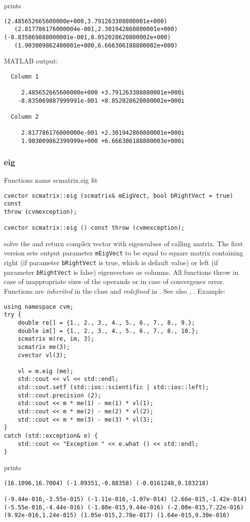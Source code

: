 prints
\begin{Verbatim}
(2.485652665600000e+000,3.791263308800001e+000)
   (2.817786176000004e-001,2.301942860800001e+000)
(-8.835069888000001e-001,8.052028620800002e+000)
   (1.903009862400001e+000,6.666306188800002e+000)
\end{Verbatim}
MATLAB output:
\begin{Verbatim}
  Column 1

     2.485652665600000e+000 +3.791263308800001e+000i
    -8.835069887999991e-001 +8.052028620800002e+000i

  Column 2

     2.817786176000000e-001 +2.301942860800001e+000i
     1.903009862399999e+000 +6.666306188800003e+000i
\end{Verbatim}
\newpage




\subsubsection{eig}
Functions%
\pdfdest name {scmatrix.eig} fit
\begin{verbatim}
cvector scmatrix::eig (scmatrix& mEigVect, bool bRightVect = true) const
throw (cvmexception);

cvector scmatrix::eig () const throw (cvmexception);
\end{verbatim}
solve the 
and return  complex vector with eigenvalues
of  calling matrix.
The first version
sets  output parameter \verb"mEigVect" to be equal
to  square matrix containing right (if parameter
\verb"bRightVect" is true, which is default value)
or left (if parameter
\verb"bRightVect" is false)
eigenvectors as columns.
All  functions
throw 
in case of inappropriate sizes of the operands
or in case of convergence error.
Functions are \emph{inherited} in the class
and \emph{redefined} in .
See also
,
.
Example:
\begin{Verbatim}
using namespace cvm;
try {
    double re[] = {1., 2., 3., 4., 5., 6., 7., 8., 9.};
    double im[] = {1., 2., 3., 4., 5., 6., 7., 8., 10.};
    scmatrix m(re, im, 3);
    scmatrix me(3);
    cvector vl(3);

    vl = m.eig (me);
    std::cout << vl << std::endl;
    std::cout.setf (std::ios::scientific | std::ios::left); 
    std::cout.precision (2);
    std::cout << m * me(1) - me(1) * vl(1);
    std::cout << m * me(2) - me(2) * vl(2);
    std::cout << m * me(3) - me(3) * vl(3);
}
catch (std::exception& e) {
    std::cout << "Exception " << e.what () << std::endl;
}
\end{Verbatim}
prints
\begin{Verbatim}
(16.1096,16.7004) (-1.09351,-0.88358) (-0.0161248,0.183218)

(-9.44e-016,-3.55e-015) (-1.11e-016,-1.07e-014) (2.66e-015,-1.42e-014)
(-5.55e-016,-4.44e-016) (-1.80e-015,9.44e-016) (-2.00e-015,7.22e-016)
(9.92e-016,1.24e-015) (1.05e-015,2.78e-017) (1.64e-015,9.30e-016)
\end{Verbatim}
\newpage




